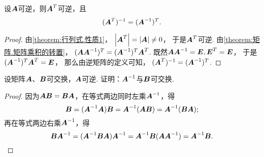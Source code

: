 \begin{property}\label{theorem:逆矩阵.转置矩阵的逆与逆矩阵的转置}
设\(\boldsymbol{A}\)可逆，则\(\boldsymbol{A}^T\)可逆，且\begin{equation}
	(\boldsymbol{A}^T)^{-1} = (\boldsymbol{A}^{-1})^T.
\end{equation}
\begin{proof}
由\cref{theorem:行列式.性质1}，
\(\abs{\boldsymbol{A}^T}=\abs{\boldsymbol{A}}\neq0\)，
于是\(\boldsymbol{A}^T\)可逆.
由\cref{theorem:矩阵.矩阵乘积的转置}，
\((\boldsymbol{A} \boldsymbol{A}^{-1})^T = (\boldsymbol{A}^{-1})^T \boldsymbol{A}^T\).
既然\(\boldsymbol{A} \boldsymbol{A}^{-1} = \boldsymbol{E}, \boldsymbol{E}^T = \boldsymbol{E}\)，
于是\((\boldsymbol{A}^{-1})^T \boldsymbol{A}^T = \boldsymbol{E}\)，
那么由逆矩阵的定义可知，
\((\boldsymbol{A}^T)^{-1}=(\boldsymbol{A}^{-1})^T\).
\end{proof}
\end{property}

\begin{example}
设矩阵\(\boldsymbol{A}\)、\(\boldsymbol{B}\)可交换，\(\boldsymbol{A}\)可逆.
证明：\(\boldsymbol{A}^{-1}\)与\(\boldsymbol{B}\)可交换.
\begin{proof}
因为\(\boldsymbol{A}\boldsymbol{B} = \boldsymbol{B}\boldsymbol{A}\)，在等式两边同时左乘\(\boldsymbol{A}^{-1}\)，得\begin{equation*}
	\boldsymbol{B} = (\boldsymbol{A}^{-1}\boldsymbol{A})\boldsymbol{B} = \boldsymbol{A}^{-1}(\boldsymbol{A}\boldsymbol{B}) = \boldsymbol{A}^{-1}(\boldsymbol{B}\boldsymbol{A});
\end{equation*}
再在等式两边右乘\(\boldsymbol{A}^{-1}\)，得\begin{equation*}
	\boldsymbol{B}\boldsymbol{A}^{-1} = (\boldsymbol{A}^{-1}\boldsymbol{B}\boldsymbol{A})\boldsymbol{A}^{-1} = \boldsymbol{A}^{-1}\boldsymbol{B}(\boldsymbol{A}\boldsymbol{A}^{-1}) = \boldsymbol{A}^{-1}\boldsymbol{B}.
	\qedhere
\end{equation*}
\end{proof}
\end{example}

